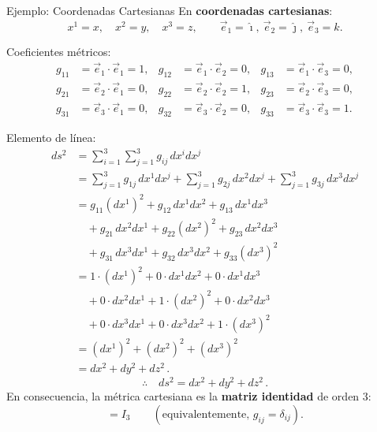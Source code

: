 \documentclass[../apunte_mecanica_clasica.tex]{subfiles}%
\begin{document}
\begin{apuntebloque}{Ejemplo: Coordenadas Cartesianas}
En \textbf{coordenadas cartesianas}:
\begin{equation*}
    x^1 = x,\quad x^2 = y,\quad x^3 = z, \qquad
    \vec{e}_1=\hat{\imath},\ \vec{e}_2=\hat{\jmath},\ \vec{e}_3=\hat{k}.
\end{equation*}

Coeficientes métricos:
\begin{align*}
    g_{11}&=\vec{e}_1\!\cdot\!\vec{e}_1=1,&
    g_{12}&=\vec{e}_1\!\cdot\!\vec{e}_2=0,&
    g_{13}&=\vec{e}_1\!\cdot\!\vec{e}_3=0,\\
    g_{21}&=\vec{e}_2\!\cdot\!\vec{e}_1=0,&
    g_{22}&=\vec{e}_2\!\cdot\!\vec{e}_2=1,&
    g_{23}&=\vec{e}_2\!\cdot\!\vec{e}_3=0,\\
    g_{31}&=\vec{e}_3\!\cdot\!\vec{e}_1=0,&
    g_{32}&=\vec{e}_3\!\cdot\!\vec{e}_2=0,&
    g_{33}&=\vec{e}_3\!\cdot\!\vec{e}_3=1.
\end{align*}

Elemento de línea:
\begin{align*}
    ds^2
      &= \sum_{i=1}^3\sum_{j=1}^3 g_{ij}\,dx^i dx^j \\[2pt]
      &= \sum_{j=1}^3 g_{1j}\,dx^1 dx^j
       + \sum_{j=1}^3 g_{2j}\,dx^2 dx^j
       + \sum_{j=1}^3 g_{3j}\,dx^3 dx^j \\[2pt]
      &= g_{11}(dx^1)^2 + g_{12}\,dx^1 dx^2 + g_{13}\,dx^1 dx^3 \\
      &\quad + g_{21}\,dx^2 dx^1 + g_{22}(dx^2)^2 + g_{23}\,dx^2 dx^3 \\
      &\quad + g_{31}\,dx^3 dx^1 + g_{32}\,dx^3 dx^2 + g_{33}(dx^3)^2 \\[2pt]
      &= 1\cdot(dx^1)^2 + 0\cdot dx^1 dx^2 + 0\cdot dx^1 dx^3 \\
      &\quad + 0\cdot dx^2 dx^1 + 1\cdot(dx^2)^2 + 0\cdot dx^2 dx^3 \\
      &\quad + 0\cdot dx^3 dx^1 + 0\cdot dx^3 dx^2 + 1\cdot(dx^3)^2 \\[4pt]
      &= (dx^1)^2 + (dx^2)^2 + (dx^3)^2 \\[2pt]
      &= dx^2 + dy^2 + dz^2 \,.
\end{align*}
\begin{equation*}
    \therefore \quad ds^2=dx^2 + dy^2 + dz^2 \,.
\end{equation*}
En consecuencia, la métrica cartesiana es la \textbf{matriz identidad} de orden $3$:
\begin{equation*}
    [g_{ij}] = I_3 \qquad (\text{equivalentemente, } g_{ij}=\delta_{ij}).
\end{equation*}
\end{apuntebloque}
\end{document}
